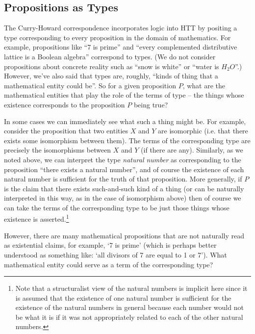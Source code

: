 \subsection{Propositions as Types}
\label{sec:TypeTheory-PropositionsAsTypes}

The Curry-Howard correspondence incorporates logic into HTT by positing a type  corresponding to every proposition in the domain of mathematics. For example, propositions like ``7 is prime'' and ``every complemented distributive lattice is a Boolean algebra'' correspond to types. (We do not consider propositions about concrete reality such as 
``snow is white'' or ``water is $H_{2}O$''.) 
However, we've also said that types are, roughly, 
``kinds of thing that a mathematical entity could be''.  So for a given proposition $P$, what are the mathematical entities that play the role of the terms of type  -- the things whose existence corresponds to the proposition $P$ being true?

In some cases we can immediately see what such a thing might be.
For example, consider the proposition that two entities $X$ and $Y$ are isomorphic (i.e. that there exists some isomorphism between them).  The terms of the corresponding type are precisely the isomorphisms between $X$ and $Y$ (if there are any).  
Similarly, as we noted above, we can interpret the type \emph{natural number} as corresponding to the proposition ``there exists a natural number'', and of course the existence of each natural number is sufficient for the truth of that proposition. More generally, if $P$ is the claim that there exists such-and-such kind of a thing (or can be naturally interpreted in this way, as in the case of isomorphism above) then of course we can take the terms of the corresponding type to be just those things whose existence is asserted.\footnote{
Note that a structuralist view of the natural numbers is implicit here since it is assumed that the existence of one natural number is sufficient for the existence of the natural numbers in general because each number would not be what it is if it was not appropriately related to each of the other natural numbers.}

However, there are many mathematical propositions that are not naturally read as existential claims, for example, `7 is prime' (which is perhaps better understood as something like: `all divisors of 7 are equal to 1 or 7'). What mathematical entity could serve as a term of the corresponding type?%

